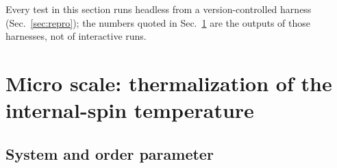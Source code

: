 \documentclass[aps,reprint,amsmath,amssymb,nofootinbib,superscriptaddress,floatfix]{revtex4-2}
\begin{document}
Every test in this section runs headless from a version-controlled
harness (Sec.~\ref{sec:repro}); the numbers quoted in
Sec.~\ref{sec:micro} are the outputs of those
harnesses, not of interactive runs.

\section{Micro scale: thermalization of the internal-spin temperature}
\label{sec:micro}

\subsection{System and order parameter}
\end{document}
